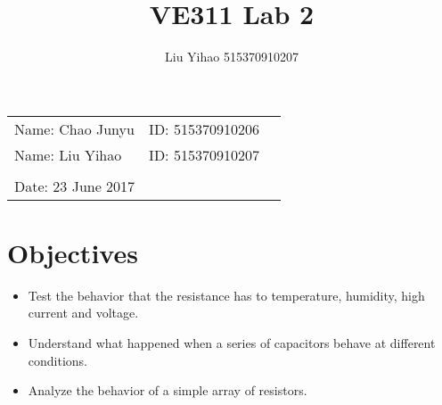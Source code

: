 \documentclass{article}
\title{VE311 Lab 2}
\author{Liu Yihao 515370910207}
\date{}
\begin{document}
\vspace*{0.25cm}

\hrulefill

\thispagestyle{empty}

\begin{center}
\begin{large}
\end{large}

\hrulefill

\vspace*{5cm}
\begin{Large}
\end{Large}

\vspace{2em}

\begin{large}
\end{large}
\end{center}

\vfill

\begin{table}[h!]
\flushleft
\begin{tabular}{lll}
Name: Chao Junyu \hspace*{2em}&
ID: 515370910206\hspace*{2em}\\
Name: Liu Yihao \hspace*{2em}&
ID: 515370910207\hspace*{2em}\\
\\

Date: 23 June 2017 

\end{tabular}
\end{table}

\hfill

\newpage
\tableofcontents
\newpage

\section{Objectives}
\begin{itemize}
	\item Test the behavior that the resistance has to temperature, humidity, high current and voltage.
	\item Understand what happened when a series of capacitors behave at different conditions.
	\item Analyze the behavior of a simple array of resistors.
\end{itemize}
\end{document}
